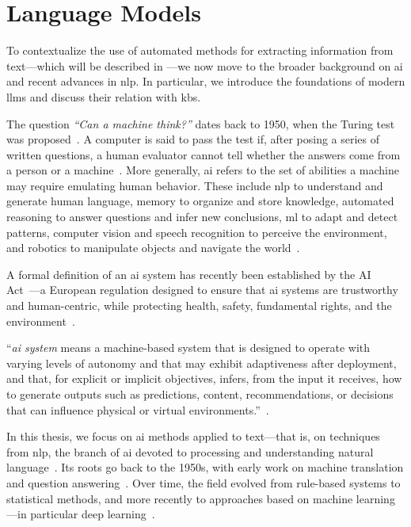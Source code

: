 \section{Language Models}
\label{sec:rw:llms}

To contextualize the use of automated methods for extracting information from text---which will be described in ---we now move to the broader background on \acl{ai} and recent advances in \acf{nlp}. In particular, we introduce the foundations of modern \acp{llm} and discuss their relation with \aclp{kb}.

The question \textit{``Can a machine think?''} dates back to 1950, when the Turing test was proposed~\cite{turing1950computing}. A computer is said to pass the test if, after posing a series of written questions, a human evaluator cannot tell whether the answers come from a person or a machine~\cite{turing1950computing}.
More generally, \ac{ai} refers to the set of abilities a machine may require emulating human behavior. These include \ac{nlp} to understand and generate human language, memory to organize and store knowledge, automated reasoning to answer questions and infer new conclusions, \acl{ml} to adapt and detect patterns, computer vision and speech recognition to perceive the environment, and robotics to manipulate objects and navigate the world~\cite{russell2020artificial}.

A formal definition of an \ac{ai} system has recently been established by the AI Act~\cite{ai_act}---a European regulation designed to ensure that \acl{ai} systems are trustworthy and human-centric, while protecting health, safety, fundamental rights, and the environment~\cite[Art.~1]{ai_act}.

\begin{definition}
``\emph{\acs{ai} system} means a machine-based system that is designed to operate with varying levels of autonomy and that may exhibit adaptiveness after deployment, and that, for explicit or implicit objectives, infers, from the input it receives, how to generate outputs such as predictions, content, recommendations, or decisions that can influence physical or virtual environments.''~\cite[Art.~3]{ai_act}.
\end{definition}

In this thesis, we focus on \ac{ai} methods applied to text---that is, on techniques from \ac{nlp}, the branch of \ac{ai} devoted to processing and understanding natural language~\cite{bates1995models}. Its roots go back to the 1950s, with early work on machine translation and question answering~\cite{bates1995models}. Over time, the field evolved from rule-based systems to statistical methods, and more recently to approaches based on machine learning---in particular deep learning~\cite{entityorientedsearch2018balog}.

